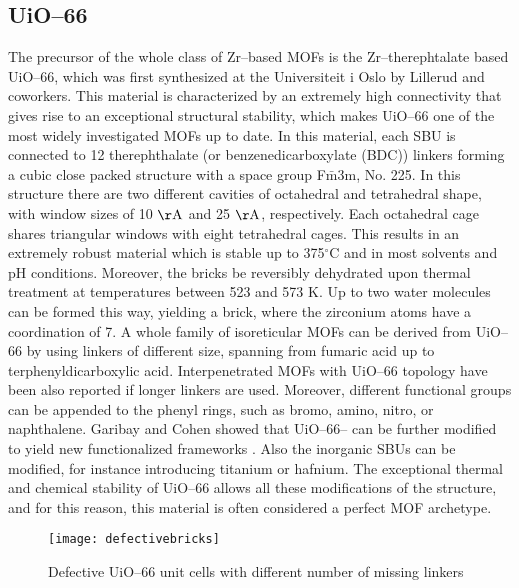 \subsection{UiO--66}
The precursor of the whole class of Zr--based MOFs is the Zr--therephtalate based UiO--66, which was first synthesized at the Universiteit i Oslo by Lillerud and coworkers\cite{cavka2008new}. This material is characterized by an extremely high connectivity that gives rise to an exceptional structural stability, which makes UiO--66 one of the most widely investigated MOFs up to date. In this material, each  SBU is connected to 12 therephthalate (or benzenedicarboxylate (BDC)) linkers forming a cubic close packed structure with a space group F$\bar{\mathrm{m}}$3m, No. 225. In this structure there are two different cavities of octahedral and tetrahedral shape, with window sizes of 10 $\mathrm{\AA}$ and 25 $\mathrm{\AA}$, respectively. Each octahedral cage shares triangular windows with eight tetrahedral cages. 
This results in an extremely robust material which is stable up to 375$^{\circ}$C and in most solvents and pH conditions. Moreover, the  bricks be reversibly dehydrated upon thermal treatment at temperatures between 523 and 573 K. Up to two water molecules can be formed this way, yielding a  brick, where the zirconium atoms have a coordination of 7\cite{valenzano2011disclosing}. 
\npar
A whole family of isoreticular MOFs can be derived from UiO--66 by using linkers of different size, spanning from fumaric acid\cite{wissmann2012modulated} up to terphenyldicarboxylic acid\cite{schaate2011modulated}. Interpenetrated MOFs with UiO--66 topology have been also reported if longer linkers are used\cite{schaate2011porous}. Moreover, different functional groups can be appended to the phenyl rings, such as bromo, amino, nitro, or naphthalene. Garibay and Cohen showed that UiO--66-- can be further modified to yield new functionalized frameworks \cite{garibay2010isoreticular}. Also the inorganic SBUs can be modified, for instance introducing titanium or hafnium\cite{kim2012postsynthetic}. The exceptional thermal and chemical stability of UiO--66 allows all these modifications of the structure, and for this reason, this material is often considered a perfect MOF archetype. 

\begin{figure}[!htbp]
	\centering
 	\texttt{[image: defectivebricks]}
	\caption{Defective UiO--66 unit cells with different number of missing linkers}
	\label{fig:defectivebricks}
\end{figure}

